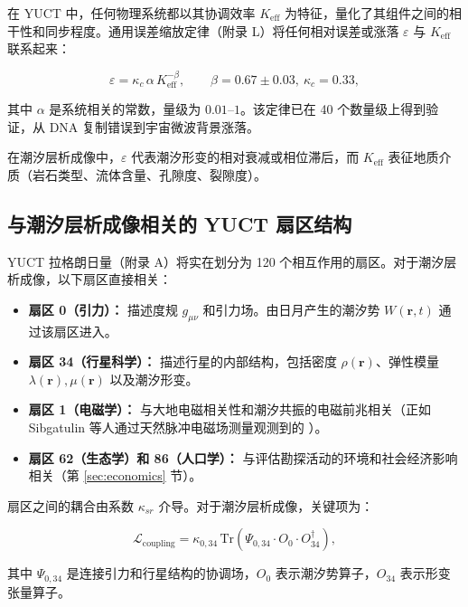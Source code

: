 \documentclass[12pt,a4paper]{article}
\theoremstyle{remark}
\newcommand{\Keff}{K_{\mathrm{eff}}}
\newcommand{\kappac}{\kappa_c}
\newcommand{\eps}{\varepsilon}
\begin{document}
	在 YUCT 中，任何物理系统都以其协调效率 $\Keff$ 为特征，量化了其组件之间的相干性和同步程度。通用误差缩放定律（附录 L）将任何相对误差或涨落 $\eps$ 与 $\Keff$ 联系起来：
	
	\begin{equation}
		\eps = \kappac \, \alpha \, \Keff^{-\beta}, \qquad \beta = 0.67 \pm 0.03,\ \kappac = 0.33,
		\label{eq:universal-scaling}
	\end{equation}
	
	其中 $\alpha$ 是系统相关的常数，量级为 $0.01$–$1$。该定律已在 40 个数量级上得到验证，从 DNA 复制错误到宇宙微波背景涨落。
	
	在潮汐层析成像中，$\eps$ 代表潮汐形变的相对衰减或相位滞后，而 $\Keff$ 表征地质介质（岩石类型、流体含量、孔隙度、裂隙度）。
	
	\subsection{与潮汐层析成像相关的 YUCT 扇区结构}
	
	YUCT 拉格朗日量（附录 A）将实在划分为 120 个相互作用的扇区。对于潮汐层析成像，以下扇区直接相关：
	
	\begin{itemize}
		\item \textbf{扇区 0（引力）：} 描述度规 $g_{\mu\nu}$ 和引力场。由日月产生的潮汐势 $W(\mathbf{r},t)$ 通过该扇区进入。
		\item \textbf{扇区 34（行星科学）：} 描述行星的内部结构，包括密度 $\rho(\mathbf{r})$、弹性模量 $\lambda(\mathbf{r}), \mu(\mathbf{r})$ 以及潮汐形变。
		\item \textbf{扇区 1（电磁学）：} 与大地电磁相关性和潮汐共振的电磁前兆相关（正如 Sibgatulin 等人通过天然脉冲电磁场测量观测到的 \cite{Sibgatulin2014}）。
		\item \textbf{扇区 62（生态学）和 86（人口学）：} 与评估勘探活动的环境和社会经济影响相关（第 \ref{sec:economics} 节）。
	\end{itemize}
	
	扇区之间的耦合由系数 $\kappa_{sr}$ 介导。对于潮汐层析成像，关键项为：
	
	\begin{equation}
		\mathcal{L}_{\text{coupling}} = \kappa_{0,34} \, \mathrm{Tr}\left(\Psi_{0,34} \cdot O_0 \cdot O_{34}^\dagger\right),
		\label{eq:coupling}
	\end{equation}
	
	其中 $\Psi_{0,34}$ 是连接引力和行星结构的协调场，$O_0$ 表示潮汐势算子，$O_{34}$ 表示形变张量算子。
	
\end{document}
